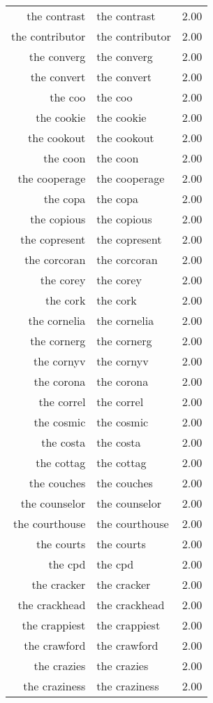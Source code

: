 \begin{table}[ht]
\begin{tabular}{rlr}
  the contrast & the contrast & 2.00 \\ 
  the contributor & the contributor & 2.00 \\ 
  the converg & the converg & 2.00 \\ 
  the convert & the convert & 2.00 \\ 
  the coo & the coo & 2.00 \\ 
  the cookie & the cookie & 2.00 \\ 
  the cookout & the cookout & 2.00 \\ 
  the coon & the coon & 2.00 \\ 
  the cooperage & the cooperage & 2.00 \\ 
  the copa & the copa & 2.00 \\ 
  the copious & the copious & 2.00 \\ 
  the copresent & the copresent & 2.00 \\ 
  the corcoran & the corcoran & 2.00 \\ 
  the corey & the corey & 2.00 \\ 
  the cork & the cork & 2.00 \\ 
  the cornelia & the cornelia & 2.00 \\ 
  the cornerg & the cornerg & 2.00 \\ 
  the cornyv & the cornyv & 2.00 \\ 
  the corona & the corona & 2.00 \\ 
  the correl & the correl & 2.00 \\ 
  the cosmic & the cosmic & 2.00 \\ 
  the costa & the costa & 2.00 \\ 
  the cottag & the cottag & 2.00 \\ 
  the couches & the couches & 2.00 \\ 
  the counselor & the counselor & 2.00 \\ 
  the courthouse & the courthouse & 2.00 \\ 
  the courts & the courts & 2.00 \\ 
  the cpd & the cpd & 2.00 \\ 
  the cracker & the cracker & 2.00 \\ 
  the crackhead & the crackhead & 2.00 \\ 
  the crappiest & the crappiest & 2.00 \\ 
  the crawford & the crawford & 2.00 \\ 
  the crazies & the crazies & 2.00 \\ 
  the craziness & the craziness & 2.00 \\ 

\end{tabular}
\end{table}
